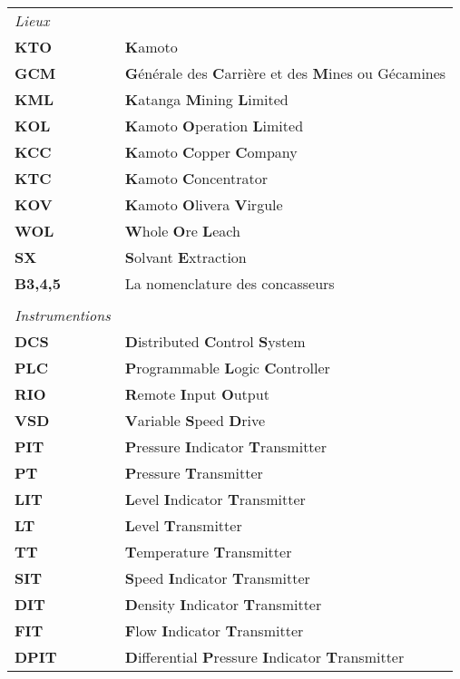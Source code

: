 \begin{tabular}{ll} %
	
	{\large \textbullet \emph{ 	Lieux}} &\\
	\textbf{KTO} & \textbf{K}amoto\\  
	\textbf{GCM} & \textbf{G}énérale des \textbf{C}arrière et des \textbf{M}ines ou Gécamines\\
	\textbf{KML} & \textbf{K}atanga \textbf{M}ining \textbf{L}imited\\
	\textbf{KOL} & \textbf{K}amoto \textbf{O}peration \textbf{L}imited\\
	\textbf{KCC} & \textbf{K}amoto \textbf{C}opper \textbf{C}ompany \\
	\textbf{KTC} & \textbf{K}amoto \textbf{C}oncentrator\\
	\textbf{KOV} & \textbf{K}amoto \textbf{O}livera \textbf{V}irgule\\
	\textbf{WOL} & \textbf{W}hole \textbf{O}re \textbf{L}each\\
	\textbf{SX} & \textbf{S}olvant \textbf{E}xtraction \\
	\textbf{B3,4,5} &  La nomenclature des concasseurs\\
	
	&\\
	{\large \textbullet \emph{ 	Instrumentions}} &\\
	\textbf{DCS} & \textbf{D}istributed \textbf{C}ontrol \textbf{S}ystem\\
	\textbf{PLC} & \textbf{P}rogrammable \textbf{L}ogic \textbf{C}ontroller\\
	\textbf{RIO} & \textbf{R}emote \textbf{I}nput \textbf{O}utput\\
	\textbf{VSD} & \textbf{V}ariable \textbf{S}peed \textbf{D}rive\\
	
	\textbf{PIT} & \textbf{P}ressure \textbf{I}ndicator \textbf{T}ransmitter\\
	\textbf{PT} & \textbf{P}ressure \textbf{T}ransmitter\\
	\textbf{LIT} & \textbf{L}evel  \textbf{I}ndicator \textbf{T}ransmitter\\
	\textbf{LT} & \textbf{L}evel \textbf{T}ransmitter\\
	\textbf{TT} & \textbf{T}emperature \textbf{T}ransmitter\\
	\textbf{SIT} & \textbf{S}peed \textbf{I}ndicator \textbf{T}ransmitter\\
	\textbf{DIT} & \textbf{D}ensity \textbf{I}ndicator \textbf{T}ransmitter\\
	\textbf{FIT} & \textbf{F}low \textbf{I}ndicator \textbf{T}ransmitter\\
	\textbf{DPIT} & \textbf{D}ifferential \textbf{P}ressure \textbf{I}ndicator \textbf{T}ransmitter\\



\end{tabular}
